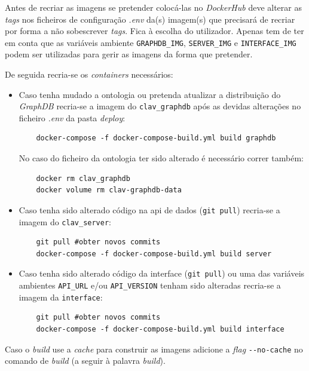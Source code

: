 Antes de recriar as imagens se pretender colocá-las no \textit{DockerHub} deve alterar as \textit{tags} nos ficheiros de configuração \textit{.env} da(s) imagem(s) que precisará de recriar por forma a não sobescrever \textit{tags}. Fica à escolha do utilizador. Apenas tem de ter em conta que as variáveis ambiente \texttt{GRAPHDB\_IMG}, \texttt{SERVER\_IMG} e \texttt{INTERFACE\_IMG} podem ser utilizadas para gerir as imagens da forma que pretender.

De seguida recria-se os \textit{containers} necessários:
\begin{itemize}
    \item Caso tenha mudado a ontologia ou pretenda atualizar a distribuição do \textit{GraphDB} recria-se a imagem do \texttt{clav\_graphdb} após as devidas alterações no ficheiro \textit{.env} da pasta \textit{deploy}:
    \footnotesize
    \begin{verbatim}
    docker-compose -f docker-compose-build.yml build graphdb
    \end{verbatim}
    \normalsize
    \vspace{-0.4cm}
    No caso do ficheiro da ontologia ter sido alterado é necessário correr também:
    \footnotesize
    \begin{verbatim}
    docker rm clav_graphdb
    docker volume rm clav-graphdb-data
    \end{verbatim}
    \normalsize
    \vspace{-0.5cm}
    \item Caso tenha sido alterado código na \acrshort{api} de dados (\verb|git pull|) recria-se a imagem do \texttt{clav\_server}:
    \footnotesize
    \begin{verbatim}
    git pull #obter novos commits
    docker-compose -f docker-compose-build.yml build server
    \end{verbatim}
    \normalsize
    \vspace{-0.5cm}
    \item Caso tenha sido alterado código da interface (\verb|git pull|) ou uma das variáveis ambientes \texttt{API\_URL} e/ou \texttt{API\_VERSION} tenham sido alteradas recria-se a imagem da \texttt{interface}:
    \footnotesize
    \begin{verbatim}
    git pull #obter novos commits
    docker-compose -f docker-compose-build.yml build interface
    \end{verbatim}
    \normalsize
    \vspace{-0.5cm}
\end{itemize}
Caso o \textit{build} use a \textit{cache} para construir as imagens adicione a \textit{flag} \verb|--no-cache| no comando de \textit{build} (a seguir à palavra \textit{build}).

